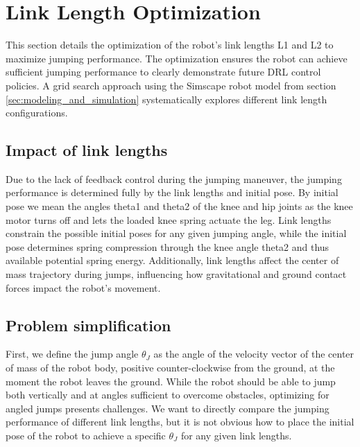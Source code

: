 \section{Link Length Optimization}
\label{sec:link_length_optimization}
This section details the optimization of the robot's link lengths L1 and L2 to maximize jumping performance. The optimization ensures the robot can achieve sufficient jumping performance to clearly demonstrate future DRL control policies. A grid search approach using the Simscape robot model from section \ref{sec:modeling_and_simulation} systematically explores different link length configurations.



\subsection{Impact of link lengths}
Due to the lack of feedback control during the jumping maneuver, the jumping performance is determined fully by the link lengths and initial pose. By initial pose we mean the angles theta1 and theta2 of the knee and hip joints as the knee motor turns off and lets the loaded knee spring actuate the leg. Link lengths constrain the possible initial poses for any given jumping angle, while the initial pose determines spring compression through the knee angle theta2 and thus available potential spring energy. Additionally, link lengths affect the center of mass trajectory during jumps, influencing how gravitational and ground contact forces impact the robot's movement.

\subsection{Problem simplification}
\label{sec:problem_simplifications}
 First, we define the jump angle \(\theta_J\) as the angle of the velocity vector of the center of mass of the robot body, positive counter-clockwise from the ground, at the moment the robot leaves the ground. While the robot should be able to jump both vertically and at angles sufficient to overcome obstacles, optimizing for angled jumps presents challenges. We want to directly compare the jumping performance of different link lengths, but it is not obvious how to place the initial pose of the robot to achieve a specific \(\theta_J\) for any given link lengths.

